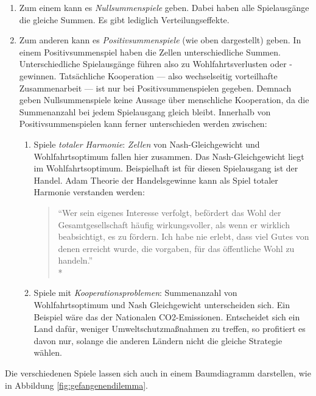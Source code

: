 \begin{enumerate}
	\item Zum einem kann es \emph{Nullsummenspiele} geben.
	Dabei haben alle Spielausgänge die gleiche Summen.
	Es gibt lediglich Verteilungseffekte.
	\item Zum anderen kann es \emph{Positivsummenspiele} (wie oben dargestellt) geben.
	In einem Positivsummenspiel haben die Zellen unterschiedliche Summen. Unterschiedliche Spielausgänge führen also zu Wohlfahrtsverlusten oder -gewinnen.
	Tatsächliche Kooperation --- also wechselseitig vorteilhafte Zusammenarbeit --- ist nur bei Positivsummenspielen gegeben.
	Demnach geben Nullsummenspiele keine Aussage über menschliche Kooperation, da die Summenanzahl bei jedem Spielausgang gleich bleibt.
	Innerhalb von Positivsummenspielen kann ferner unterschieden werden zwischen:
	\begin{enumerate}
		\item Spiele \emph{totaler Harmonie}: \emph{Zellen} von Nash-Gleichgewicht und Wohlfahrtsoptimum fallen hier zusammen.
		Das Nash-Gleichgewicht liegt im Wohlfahrtsoptimum.
		Beispielhaft ist für diesen Spielausgang ist der Handel.
		Adam \textcite{Smith-1776-lq} Theorie der Handelsgewinne kann als Spiel totaler Harmonie verstanden werden:
		\begin{quote}
			``Wer sein eigenes Interesse verfolgt, befördert das Wohl der Gesamtgesellschaft häufig wirkungsvoller, als wenn er wirklich beabsichtigt, es zu fördern.
			Ich habe nie erlebt, dass viel Gutes von denen erreicht wurde, die vorgaben, für das öffentliche Wohl zu handeln.''\\*
			\textcite{Smith-1776-lq}
		\end{quote}

		\item Spiele mit \emph{Kooperationsproblemen}: Summenanzahl von Wohlfahrtsoptimum und Nash Gleichgewicht unterscheiden sich.
		Ein Beispiel wäre das der Nationalen CO2-Emissionen.
		Entscheidet sich ein Land dafür, weniger Umweltschutzmaßnahmen zu treffen, so profitiert es davon nur, solange die anderen Ländern nicht die gleiche Strategie wählen.
	\end{enumerate}
\end{enumerate}

Die verschiedenen Spiele lassen sich auch in einem Baumdiagramm darstellen, wie in Abbildung \ref{fig:gefangenendilemma}.

